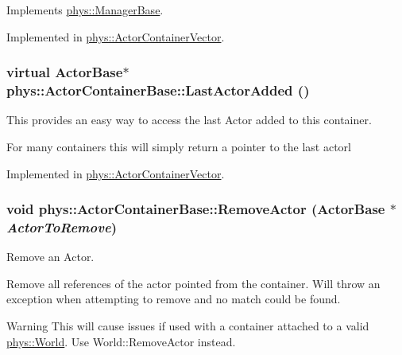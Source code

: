 Implements \hyperlink{classphys_1_1ManagerBase_a57dd8e54e767427d5bdcc86dc66d73ed}{phys::ManagerBase}.



Implemented in \hyperlink{classphys_1_1ActorContainerVector_adcebf4329a587669f74e1eacc1e6912c}{phys::ActorContainerVector}.

\hypertarget{classphys_1_1ActorContainerBase_a6ccc6d058bcbbe0b9a638e28fb136477}{
\subsubsection[{LastActorAdded}]{\setlength{\rightskip}{0pt plus 5cm}virtual {\bf ActorBase}$\ast$ phys::ActorContainerBase::LastActorAdded ()}}
\label{d1/d00/classphys_1_1ActorContainerBase_a6ccc6d058bcbbe0b9a638e28fb136477}


This provides an easy way to access the last Actor added to this container. 

For many containers this will simply return a pointer to the last actorl 

Implemented in \hyperlink{classphys_1_1ActorContainerVector_a49e643bdeff78521de9c4a9fea59a0d2}{phys::ActorContainerVector}.

\hypertarget{classphys_1_1ActorContainerBase_a579e049a3190fcc1f951b3212c209616}{
\subsubsection[{RemoveActor}]{\setlength{\rightskip}{0pt plus 5cm}void phys::ActorContainerBase::RemoveActor ({\bf ActorBase} $\ast$ {\em ActorToRemove})}}
\label{d1/d00/classphys_1_1ActorContainerBase_a579e049a3190fcc1f951b3212c209616}


Remove an Actor. 

Remove all references of the actor pointed from the container. Will throw an exception when attempting to remove and no match could be found. \begin{DoxyWarning}{Warning}
This will cause issues if used with a container attached to a valid \hyperlink{classphys_1_1World}{phys::World}. Use World::RemoveActor instead. 
\end{DoxyWarning}


